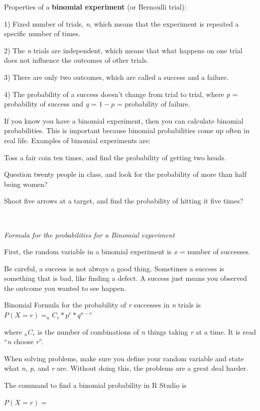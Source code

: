 \documentclass[
]{book}
\begin{document}
Properties of a \textbf{binomial experiment} (or Bernoulli trial):

1) Fixed number of trials, \emph{n}, which means that the experiment is repeated a specific number of times.

2) The \emph{n} trials are independent, which means that what happens on one trial does not influence the outcomes of other trials.

3) There are only two outcomes, which are called a success and a failure.

4) The probability of a success doesn't change from trial to trial, where \emph{p} = probability of success and \emph{q} = \(1-p\) = probability of failure.

If you know you have a binomial experiment, then you can calculate binomial probabilities. This is important because binomial probabilities come up often in real life. Examples of binomial experiments are:

Toss a fair coin ten times, and find the probability of getting two heads.

Question twenty people in class, and look for the probability of more than half being women?

Shoot five arrows at a target, and find the probability of hitting it five times?

\textbf{\\
}

\emph{Formula for the probabilities for a Binomial experiment}

First, the random variable in a binomial experiment is \emph{x} = number of successes.

Be careful, a success is not always a good thing. Sometimes a success is something that is bad, like finding a defect. A success just means you observed the outcome you wanted to see happen.

Binomial Formula for the probability of \emph{r} successes in \emph{n} trials is \(P(X=r)=_nC_r*p^r*q^{n-r}\)

where \(_nC_r\) is the number of combinations of \emph{n} things taking \emph{r} at a time. It
is read ``\emph{n} choose \emph{r}''.

When solving problems, make sure you define your random variable and state what \emph{n}, \emph{p}, and \emph{r} are. Without doing this, the problems are a great deal harder.

The command to find a binomial probability in R Studio is

\(P(X=r)=\)
\end{document}
